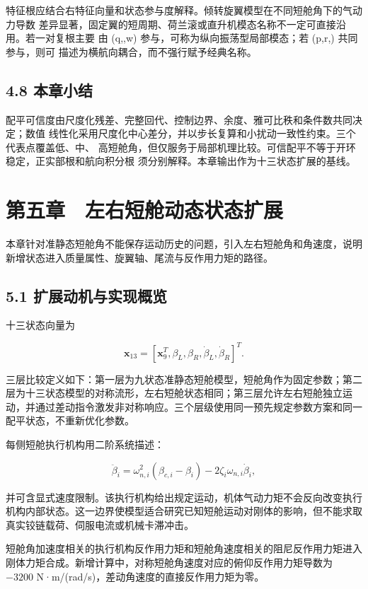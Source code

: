\documentclass[UTF8,11pt,oneside,openany,fontset=windows]{ctexbook}
\begin{document}
特征根应结合右特征向量和状态参与度解释。倾转旋翼模型在不同短舱角下的气动力导数
差异显著，固定翼的短周期、荷兰滚或直升机模态名称不一定可直接沿用。若一对复根主要
由 (q,\theta,w) 参与，可称为纵向振荡型局部模态；若 (p,r,\phi)
共同参与，则可 描述为横航向耦合，而不强行赋予经典名称。

\section{4.8 本章小结}\label{ux672cux7ae0ux5c0fux7ed3-2}

配平可信度由尺度化残差、完整回代、控制边界、余度、雅可比秩和条件数共同决定；数值
线性化采用尺度化中心差分，并以步长复算和小扰动一致性约束。三个代表点覆盖低、中、
高短舱角，但仅服务于局部机理比较。可信配平不等于开环稳定，正实部根和航向积分根
须分别解释。本章输出作为十三状态扩展的基线。

\chapter{第五章　左右短舱动态状态扩展}\label{ux7b2cux4e94ux7ae0-ux5de6ux53f3ux77edux8231ux52a8ux6001ux72b6ux6001ux6269ux5c55}

本章针对准静态短舱角不能保存运动历史的问题，引入左右短舱角和角速度，说明新增状态进入质量属性、旋翼轴、尾流与反作用力矩的路径。

\section{5.1
扩展动机与实现概览}\label{ux6269ux5c55ux52a8ux673aux4e0eux5b9eux73b0ux6982ux89c8}

十三状态向量为

\[\mathbf{x}_{13}=
[\mathbf{x}_9^T,\beta_L,\beta_R,\dot\beta_L,\dot\beta_R]^T.\]

三层比较定义如下：第一层为九状态准静态短舱模型，短舱角作为固定参数；第二层为十三状态模型的对称流形，左右短舱状态相同；第三层允许左右短舱独立运动，并通过差动指令激发非对称响应。三个层级使用同一预先规定参数方案和同一配平状态，不重新优化参数。

每侧短舱执行机构用二阶系统描述：

\[\ddot\beta_i=\omega_{n,i}^2(\beta_{c,i}-\beta_i)
-2\zeta_i\omega_{n,i}\dot\beta_i,\]

并可含显式速度限制。该执行机构给出规定运动，机体气动力矩不会反向改变执行机构内部状态。这一边界使模型适合研究已知短舱运动对刚体的影响，但不能求取真实铰链载荷、伺服电流或机械卡滞冲击。

短舱角加速度相关的执行机构反作用力矩和短舱角速度相关的阻尼反作用力矩进入刚体力矩合成。新增计算中，对称短舱角速度对应的俯仰反作用力矩导数为
\(-3200\) N·m/(rad/s)，差动角速度的直接反作用力矩为零。
\end{document}
